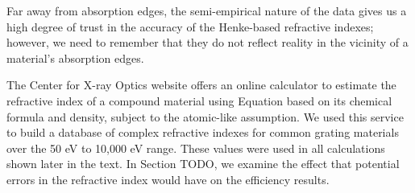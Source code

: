 Far away from absorption edges, the semi-empirical nature of the data gives us a high degree of trust in the accuracy of the Henke-based refractive indexes; however, we need to remember that they do not reflect reality in the vicinity of a material's absorption edges.

The Center for X-ray Optics website \cite{CXR11} offers an online calculator to estimate the refractive index of a compound material using Equation  based on its chemical formula and density, subject to the atomic-like assumption.  We used this service to build a database of complex refractive indexes for common grating materials over the 50 eV to 10,000 eV range.  These values were used in all calculations shown later in the text.  In Section TODO, we examine the effect that potential errors in the refractive index would have on the efficiency results.
